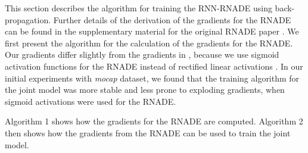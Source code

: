 \documentclass{article} %
\begin{document}
This section describes the algorithm for training the RNN-RNADE using back-propagation. Further details of the derivation of the gradients for the RNADE can be found in the supplementary material for the original RNADE paper \cite{Uria2013}. We first present the algorithm for the calculation of the gradients for the RNADE. Our gradients differ slightly from the gradients in \cite{Uria2013}, because we use sigmoid activation functions for the RNADE instead of rectified linear activations \cite{Uria2013}. In our initial experiments with \textit{mocap} dataset, we found that the training algorithm for the joint model was more stable and less prone to exploding gradients, when sigmoid activations were used for the RNADE. 

Algorithm 1 shows how the gradients for the RNADE are computed. Algorithm 2 then shows how the gradients from the RNADE can be used to train the joint model. 
\end{document}
